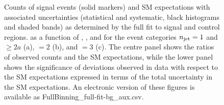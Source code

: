 \begin{figure}
\begin{center}
  \caption{Counts of signal events (solid markers) and SM expectations
    with associated uncertainties (statistical and systematic, black
    histograms and shaded bands) 
    as determined by the full fit to signal and control regions.
    as a function of \nb, \scalht, and \mht for the event categories
	    $n_{\text{jet}} = 1$ and ${\geq}2a$ (a), $=2$ (b), and $=3$ (c).
    The centre panel shows the ratios of
    observed counts and the SM expectations, while the lower panel
    shows the significance of deviations observed in data with respect
    to the SM expectations expressed in terms of the total uncertainty
    in the SM expectations.
    An electronic version of these figures is available as FullBinning\_full-fit-bg\_aux.csv.
    }
        \label{fig:T1qqqqLL_full-fit_123}
    \end{center}
\end{figure}

